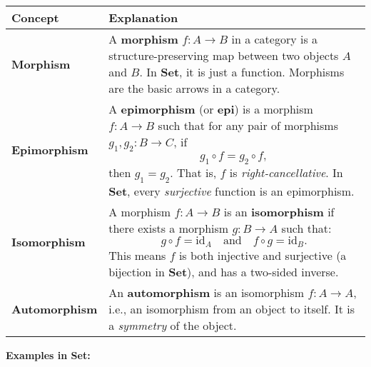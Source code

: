 \documentclass[10pt]{article}
\theoremstyle{plain}
\theoremstyle{definition}
\begin{document}
\begin{center}
	\renewcommand{\arraystretch}{1.6}
	\begin{tabular}{|p{3.5cm}|p{11cm}|}
		\hline
		\textbf{Concept} & \textbf{Explanation} \\
		\hline
		
		\textbf{Morphism} & A \textbf{morphism} \( f: A \to B \) in a category is a structure-preserving map between two objects \( A \) and \( B \). In \textbf{Set}, it is just a function. Morphisms are the basic arrows in a category. \\
		
		\hline
		
		\textbf{Epimorphism} & A \textbf{epimorphism} (or \textbf{epi}) is a morphism \( f: A \to B \) such that for any pair of morphisms \( g_1, g_2: B \to C \), if
		\[
		g_1 \circ f = g_2 \circ f,
		\]
		then \( g_1 = g_2 \). That is, \( f \) is \emph{right-cancellative}. In \textbf{Set}, every \emph{surjective} function is an epimorphism. \\
		
		\hline
		
		\textbf{Isomorphism} & A morphism \( f: A \to B \) is an \textbf{isomorphism} if there exists a morphism \( g: B \to A \) such that:
		\[
		g \circ f = \mathrm{id}_A \quad \text{and} \quad f \circ g = \mathrm{id}_B.
		\]
		This means \( f \) is both injective and surjective (a bijection in \textbf{Set}), and has a two-sided inverse. \\
		
		\hline
		
		\textbf{Automorphism} & An \textbf{automorphism} is an isomorphism \( f: A \to A \), i.e., an isomorphism from an object to itself. It is a \emph{symmetry} of the object. \\
		
		\hline
	\end{tabular}
\end{center}



\medskip

\textbf{Examples in \textbf{Set}:}
\end{document}
